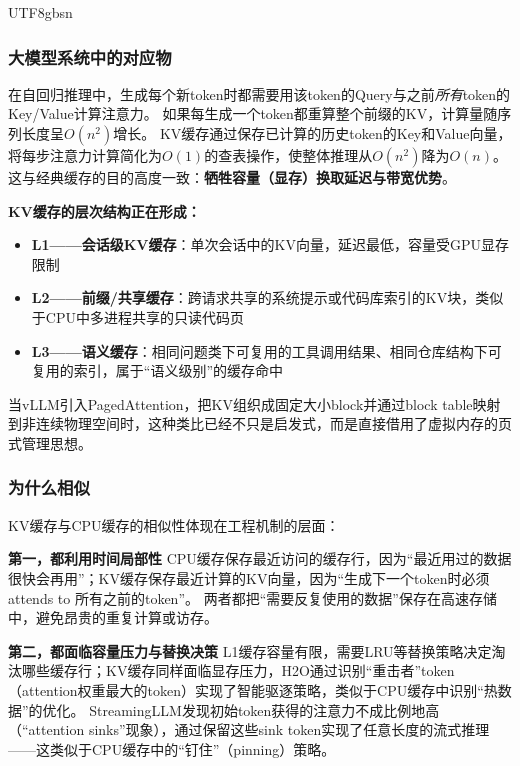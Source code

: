 \documentclass[11pt,a4paper]{article}
\begin{document}
\begin{CJK*}{UTF8}{gbsn}
\subsubsection{大模型系统中的对应物}

在自回归推理中，生成每个新token时都需要用该token的Query与之前\textit{所有}token的Key/Value计算注意力。
如果每生成一个token都重算整个前缀的KV，计算量随序列长度呈$O(n^2)$增长。
KV缓存通过保存已计算的历史token的Key和Value向量，将每步注意力计算简化为$O(1)$的查表操作，使整体推理从$O(n^2)$降为$O(n)$。
这与经典缓存的目的高度一致：\textbf{牺牲容量（显存）换取延迟与带宽优势}\cite{drepper2007memory,kwon2023pagedattention}。

\textbf{KV缓存的层次结构正在形成：}
\begin{itemize}[nosep]
\item \textbf{L1——会话级KV缓存}：单次会话中的KV向量，延迟最低，容量受GPU显存限制
\item \textbf{L2——前缀/共享缓存}：跨请求共享的系统提示或代码库索引的KV块，类似于CPU中多进程共享的只读代码页\cite{vllm_prefix_2026,sglang_docs_2026,gim2024promptcache}
\item \textbf{L3——语义缓存}：相同问题类下可复用的工具调用结果、相同仓库结构下可复用的索引，属于``语义级别''的缓存命中
\end{itemize}

当vLLM引入PagedAttention，把KV组织成固定大小block并通过block table映射到非连续物理空间时，这种类比已经不只是启发式，而是直接借用了虚拟内存的页式管理思想\cite{kwon2023pagedattention}。

\subsubsection{为什么相似}

KV缓存与CPU缓存的相似性体现在工程机制的层面：

\textbf{第一，都利用时间局部性}
CPU缓存保存最近访问的缓存行，因为``最近用过的数据很快会再用''；KV缓存保存最近计算的KV向量，因为``生成下一个token时必须 attends to 所有之前的token''。
两者都把``需要反复使用的数据''保存在高速存储中，避免昂贵的重复计算或访存。

\textbf{第二，都面临容量压力与替换决策}
L1缓存容量有限，需要LRU等替换策略决定淘汰哪些缓存行；KV缓存同样面临显存压力，H2O通过识别``重击者''token（attention权重最大的token）实现了智能驱逐策略\cite{h2o2023}，类似于CPU缓存中识别``热数据''的优化。
StreamingLLM发现初始token获得的注意力不成比例地高（``attention sinks''现象），通过保留这些sink token实现了任意长度的流式推理\cite{xiao2024streamingllm}——这类似于CPU缓存中的``钉住''（pinning）策略。


\end{CJK*}
\end{document}
